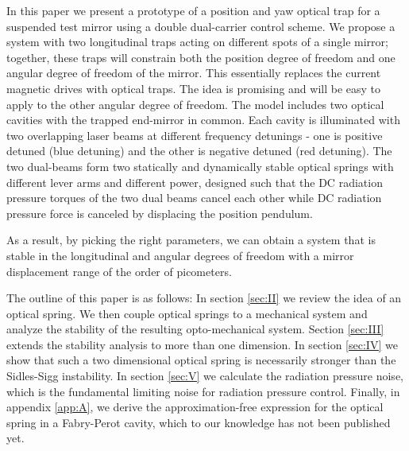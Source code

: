\documentclass[%
 reprint,
 amsmath,amssymb,
 aps,
]{revtex4-1}
\begin{document}
In this paper we present
a prototype of a position and yaw optical trap for a suspended test mirror using a double dual-carrier control 
scheme. 
We propose a system with two longitudinal traps acting on different spots of a single mirror; together, these traps will constrain both the position degree of freedom and one angular degree of freedom of the mirror.
This essentially replaces the current magnetic drives with optical traps.  The idea is promising and will be easy to apply to the other
angular degree of freedom.
The model includes two optical cavities with the trapped end-mirror in common. Each cavity is illuminated with two overlapping laser beams at different frequency detunings - one is positive detuned (blue detuning) and the other is negative detuned (red detuning).
The two dual-beams form two statically and dynamically stable optical springs with different lever arms and different power, designed such that the DC radiation pressure torques of the two dual beams cancel each other while 
DC radiation pressure force is canceled by displacing the position pendulum.

As a result, by picking the right 
parameters, we can obtain a system that is stable in the longitudinal and angular degrees of freedom with a mirror 
displacement range of the order of picometers.

The outline of this paper is as follows: In section \ref{sec:II} we review the idea of an optical spring. We then couple optical springs to a mechanical system and analyze the stability of the resulting opto-mechanical system.
Section \ref{sec:III} extends the stability analysis to more than one dimension.
In section \ref{sec:IV} we show that such a two dimensional optical spring is necessarily stronger than the Sidles-Sigg instability. In section \ref{sec:V} we calculate the radiation pressure noise, which is the fundamental limiting noise for radiation pressure control. Finally, in appendix \ref{app:A}, we derive the approximation-free expression for the optical spring in a Fabry-Perot cavity, which to our knowledge has not been published yet.
\end{document}
